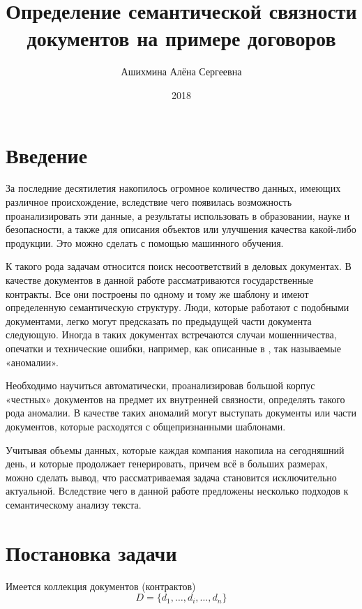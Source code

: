 \documentclass[12pt]{article}
\author{Ашихмина Алёна Сергеевна}
\title{Определение семантической связности \\ документов на примере договоров}
\date{2018}
\begin{document}
\maketitle{}

\topmargin=-1.5cm
\setlength{\textheight}{20.8cm}
\setlength{\textwidth}{16.1cm}
\hoffset=-5mm
\voffset=10mm
\parindent=12mm

\newpage
\tableofcontents
\newpage



\section{Введение}
За последние десятилетия накопилось огромное количество данных, имеющих различное происхождение, вследствие чего появилась возможность проанализировать эти данные, а результаты использовать в образовании, науке и безопасности, а также для описания объектов или улучшения качества какой-либо продукции. Это можно сделать с помощью машинного обучения. 

К такого рода задачам относится поиск несоответствий в деловых документах. В качестве документов в данной работе рассматриваются государственные контракты. Все они построены по одному и тому же шаблону и имеют определенную семантическую структуру. Люди, которые работают с подобными документами, легко могут предсказать по предыдущей части документа следующую. Иногда в таких документах встречаются случаи мошенничества, опечатки и технические ошибки, например, как описанные в \cite{vedomosti,fontanka}, так называемые «аномалии». 

Необходимо научиться автоматически, проанализировав большой корпус «честных» документов на предмет их внутренней связности, определять такого рода аномалии. В качестве таких аномалий могут выступать документы или части документов, которые расходятся с общепризнанными шаблонами.

Учитывая объемы данных, которые каждая компания накопила на сегодняшний день, и которые продолжает генерировать, причем всё в больших размерах, можно сделать вывод, что рассматриваемая задача становится исключительно актуальной. Вследствие чего в данной работе предложены несколько подходов к семантическому анализу текста. 

\newpage
\section{Постановка задачи}
Имеется коллекция документов (контрактов) $$D = \{d_1,\ldots,d_i,\ldots,d_n\}$$
\end{document}
